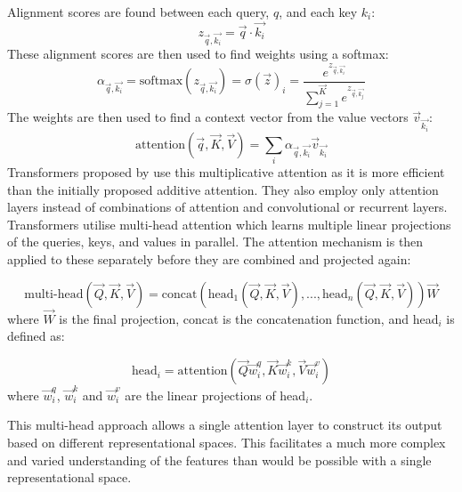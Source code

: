 \documentclass[../thesis.tex]{subfiles}
\begin{document}
Alignment scores are found between each query, $q$, and each key $k_i$:
\begin{equation}\label{LTCA__eq__attention_alignment_score}
    z_{\vec{q},\vec{k_i}}=\vec{q} \cdot \vec{k_i} 
\end{equation}
These alignment scores are then used to find weights using a softmax:
\begin{equation}\label{LTCA__eq__attention_weight_calc}
    \alpha_{\vec{q},\vec{k_i}}=\text{softmax}(z_{\vec{q},\vec{k_i}}) = \sigma(\vec{z})_{i} =\frac{e^{z_{\vec{q},\vec{k_i}}}}{\sum_{j=1}^{\vec{K}} e^{z_{\vec{q},\vec{k_j}}}}
\end{equation}
The weights are then used to find a context vector from the value vectors $\vec{v}_{\vec{k_i}}$: 
\begin{equation}
    \text{attention}(\vec{q}, \vec{K}, \vec{V}) = \sum_i \alpha_{\vec{q},\vec{k_i}} \vec{v}_{\vec{k_i}}
\end{equation}
Transformers proposed by \citet{vaswani2017attention} use this multiplicative attention as it is more efficient  than the initially proposed additive attention. They also employ only attention layers instead of combinations of attention and convolutional or recurrent layers. 
Transformers utilise multi-head attention which learns multiple linear projections of the queries, keys, and values in parallel.
The attention mechanism is then applied to these separately before they are combined and projected again:

\begin{equation}\label{eq__LTCA__multi-head-attention}
    \text{multi-head}(\vec{Q},\vec{K},\vec{V}) = \text{concat}(\text{head}_1(\vec{Q},\vec{K},\vec{V}),  ... , \text{head}_n(\vec{Q},\vec{K},\vec{V}))\vec{W}
\end{equation}
\noindent where $\vec{W}$ is the final projection, concat is the concatenation function, and head$_i$ is defined as:

\begin{equation}\label{eq__LTCA__singleheadattention}
    \text{head}_i = \text{attention}(\vec{Q}\vec{w}^{q}_{i},\vec{K}\vec{w}^{k}_{i},\vec{V}\vec{w}^{v}_{i})
\end{equation}
\noindent  where $\vec{w}^{q}_{i}$, $\vec{w}^{k}_{i}$ and $\vec{w}^{v}_{i}$ are the linear projections of head$_i$.

This multi-head approach allows a single attention layer to construct its output based on different representational spaces. This facilitates a much more complex and varied understanding of the features than would be possible with a single representational space.
\end{document}
